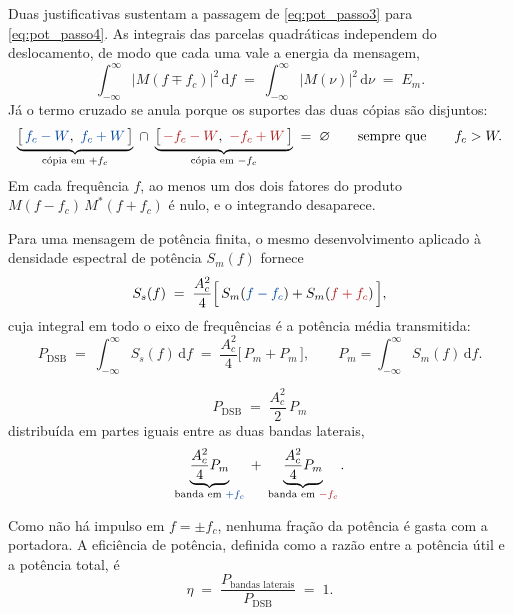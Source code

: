 \documentclass[11pt,a4paper]{article}
\newcommand{\DSB}{\text{DSB}}
\newcommand{\dd}{\,\mathrm{d}}
\begin{document}
Duas justificativas sustentam a passagem de \eqref{eq:pot_passo3} para \eqref{eq:pot_passo4}. As integrais das parcelas quadráticas independem do deslocamento, de modo que cada uma vale a energia da mensagem,
\[
  \int_{-\infty}^{\infty}\bigl|M(f \mp f_c)\bigr|^{2}\dd f
  \;=\; \int_{-\infty}^{\infty}\bigl|M(\nu)\bigr|^{2}\dd \nu
  \;=\; E_m .
\]
Já o termo cruzado se anula porque os suportes das duas cópias são disjuntos:
\begin{equation}
  \underbrace{\bigl[\,\textcolor{azul}{f_c-W},\ \textcolor{azul}{f_c+W}\,\bigr]}_{\text{cópia em } +f_c}
  \;\cap\;
  \underbrace{\bigl[\,\textcolor{vermelho}{-f_c-W},\ \textcolor{vermelho}{-f_c+W}\,\bigr]}_{\text{cópia em } -f_c}
  \;=\; \varnothing
  \qquad \text{sempre que} \qquad f_c > W .
  \label{eq:suportes_disjuntos}
\end{equation}
Em cada frequência $f$, ao menos um dos dois fatores do produto $M(f-f_c)\,M^{*}(f+f_c)$ é nulo, e o integrando desaparece.

Para uma mensagem de potência finita, o mesmo desenvolvimento aplicado à densidade espectral de potência $S_m(f)$ fornece
\begin{equation}
  S_{s}(f) \;=\; \frac{A_c^{2}}{4}\Bigl[\, S_m(\textcolor{azul}{f-f_c}) + S_m(\textcolor{vermelho}{f+f_c}) \,\Bigr],
  \label{eq:dep_dsbsc}
\end{equation}
cuja integral em todo o eixo de frequências é a potência média transmitida:
\begin{equation}
  P_{\DSB} \;=\; \int_{-\infty}^{\infty} S_{s}(f)\dd f
  \;=\; \frac{A_c^{2}}{4}\bigl[\,P_m + P_m\,\bigr],
  \qquad
  P_m = \int_{-\infty}^{\infty} S_m(f)\dd f .
  \label{eq:pot_integra_dep}
\end{equation}

\begin{quadro}
\[
  \boxed{\;P_{\DSB} \;=\; \frac{A_c^{2}}{2}\,P_m\;}
\]
distribuída em partes iguais entre as duas bandas laterais,
\[
  \underbrace{\frac{A_c^{2}}{4}P_m}_{\text{banda em } \textcolor{azul}{+f_c}}
  \;+\;
  \underbrace{\frac{A_c^{2}}{4}P_m}_{\text{banda em } \textcolor{vermelho}{-f_c}} .
\]
\end{quadro}

Como não há impulso em $f = \pm f_c$, nenhuma fração da potência é gasta com a portadora. A eficiência de potência, definida como a razão entre a potência útil e a potência total, é
\begin{equation}
  \eta \;=\; \frac{P_{\text{bandas laterais}}}{P_{\DSB}} \;=\; 1 .
  \label{eq:eficiencia_dsbsc}
\end{equation}
\end{document}
